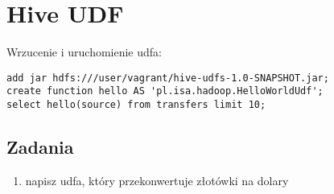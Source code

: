 \documentclass{article}
\begin{document}
\section*{Hive UDF}

Wrzucenie i uruchomienie udfa:
\begin{lstlisting}
add jar hdfs:///user/vagrant/hive-udfs-1.0-SNAPSHOT.jar;
create function hello AS 'pl.isa.hadoop.HelloWorldUdf';
select hello(source) from transfers limit 10;
\end{lstlisting}

\subsection*{Zadania}

\begin{enumerate}
\item napisz udfa, który przekonwertuje złotówki na dolary
\end{enumerate}
\end{document}
